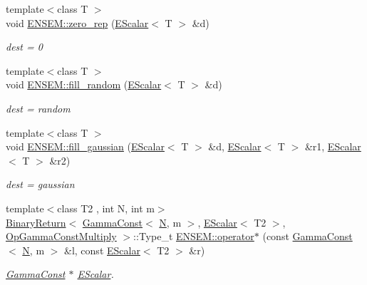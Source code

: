 \begin{DoxyCompactItemize}
{\footnotesize template$<$class T $>$ }\\void \mbox{\hyperlink{group__escalar_gacea96299b1b52d3a75cdb109c3b03b05}{E\+N\+S\+E\+M\+::zero\+\_\+rep}} (\mbox{\hyperlink{classENSEM_1_1EScalar}{E\+Scalar}}$<$ T $>$ \&d)
\begin{DoxyCompactList}\small\item\em dest = 0 \end{DoxyCompactList}\item 
{\footnotesize template$<$class T $>$ }\\void \mbox{\hyperlink{group__escalar_gab876765eed1c2ac8b1d1adcf0b0ba123}{E\+N\+S\+E\+M\+::fill\+\_\+random}} (\mbox{\hyperlink{classENSEM_1_1EScalar}{E\+Scalar}}$<$ T $>$ \&d)
\begin{DoxyCompactList}\small\item\em dest = random \end{DoxyCompactList}\item 
{\footnotesize template$<$class T $>$ }\\void \mbox{\hyperlink{group__escalar_ga3598759ad3e33b4008dd80a044cc75a8}{E\+N\+S\+E\+M\+::fill\+\_\+gaussian}} (\mbox{\hyperlink{classENSEM_1_1EScalar}{E\+Scalar}}$<$ T $>$ \&d, \mbox{\hyperlink{classENSEM_1_1EScalar}{E\+Scalar}}$<$ T $>$ \&r1, \mbox{\hyperlink{classENSEM_1_1EScalar}{E\+Scalar}}$<$ T $>$ \&r2)
\begin{DoxyCompactList}\small\item\em dest = gaussian \end{DoxyCompactList}\item 
{\footnotesize template$<$class T2 , int N, int m$>$ }\\\mbox{\hyperlink{structENSEM_1_1BinaryReturn}{Binary\+Return}}$<$ \mbox{\hyperlink{classENSEM_1_1GammaConst}{Gamma\+Const}}$<$ \mbox{\hyperlink{adat__devel_2lib_2hadron_2operator__name__util_8cc_a7722c8ecbb62d99aee7ce68b1752f337}{N}}, m $>$, \mbox{\hyperlink{classENSEM_1_1EScalar}{E\+Scalar}}$<$ T2 $>$, \mbox{\hyperlink{structENSEM_1_1OpGammaConstMultiply}{Op\+Gamma\+Const\+Multiply}} $>$\+::Type\+\_\+t \mbox{\hyperlink{group__escalar_gae8dabaf2e8ff409632f9943294b5a6b4}{E\+N\+S\+E\+M\+::operator$\ast$}} (const \mbox{\hyperlink{classENSEM_1_1GammaConst}{Gamma\+Const}}$<$ \mbox{\hyperlink{adat__devel_2lib_2hadron_2operator__name__util_8cc_a7722c8ecbb62d99aee7ce68b1752f337}{N}}, m $>$ \&l, const \mbox{\hyperlink{classENSEM_1_1EScalar}{E\+Scalar}}$<$ T2 $>$ \&r)
\begin{DoxyCompactList}\small\item\em \mbox{\hyperlink{classENSEM_1_1GammaConst}{Gamma\+Const}} $\ast$ \mbox{\hyperlink{classENSEM_1_1EScalar}{E\+Scalar}}. \end{DoxyCompactList}\item 

\end{DoxyCompactItemize}
